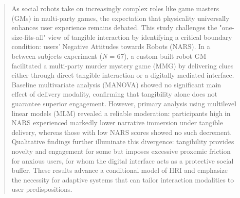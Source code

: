 \documentclass[sigconf,screen]{acmart-tagged}
\begin{document}
\begin{abstract}
As social robots take on increasingly complex roles like game masters (GMs) in multi-party games, the expectation that physicality universally enhances user experience remains debated. This study challenges the "one-size-fits-all" view of tangible interaction by identifying a critical boundary condition: users' Negative Attitudes towards Robots (NARS). In a between-subjects experiment (\emph{N} = 67), a custom-built robot GM facilitated a multi-party murder mystery game (MMG) by delivering clues either through direct tangible interaction or a digitally mediated interface. Baseline multivariate analysis (MANOVA) showed no significant main effect of delivery modality, confirming that tangibility alone does not guarantee superior engagement. However, primary analysis using multilevel linear models (MLM) revealed a reliable moderation: participants high in NARS experienced markedly lower narrative immersion under tangible delivery, whereas those with low NARS scores showed no such decrement. Qualitative findings further illuminate this divergence: tangibility provides novelty and engagement for some but imposes excessive proxemic friction for anxious users, for whom the digital interface acts as a protective social buffer. These results advance a conditional model of HRI and emphasize the necessity for adaptive systems that can tailor interaction modalities to user predispositions.
\end{abstract}

\end{document}
